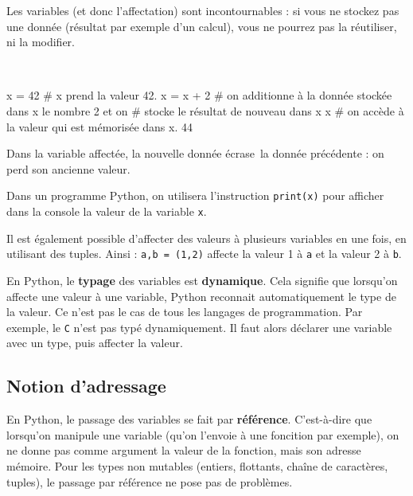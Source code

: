 Les variables (et donc l'affectation) sont incontournables : si vous ne stockez pas une donnée 
(résultat par exemple d'un calcul), vous ne pourrez pas la réutiliser, ni la modifier.



\begin{xxpyconsole}~\\ \vspace{-.5cm}%
\begin{pyconsole}
x = 42       # x prend la valeur 42.
x = x + 2	# on additionne à la donnée stockée dans x le nombre 2 et on 
             # stocke le résultat de nouveau dans x 
x            # on accède à la valeur qui est mémorisée dans x.
44
\end{pyconsole}
\end{xxpyconsole}

Dans la variable affectée, la nouvelle donnée \og écrase\fg\ la donnée précédente : on perd son 
ancienne valeur.

Dans un programme Python, on utilisera l'instruction \texttt{print(x)}
pour afficher dans la console la valeur de la variable \texttt{x}.

Il est également possible d'affecter des valeurs à plusieurs variables en une fois, en utilisant 
des tuples. Ainsi : \texttt{a,b = (1,2)} affecte la valeur 1 à \texttt{a} et la valeur 2 à 
\texttt{b}.


\begin{rem}
En Python, le \textbf{typage} des variables est \textbf{dynamique}. Cela signifie que lorsqu'on affecte une valeur à une variable, Python reconnait automatiquement le type de la valeur. Ce n'est pas le cas de tous les langages de programmation.
Par exemple, le \texttt{C} n'est pas typé dynamiquement. Il faut alors déclarer une variable avec un type, puis affecter la valeur. 

\end{rem}
\subsection{Notion d'adressage}

En Python, le passage des variables se fait par \textbf{référence}. C'est-à-dire que lorsqu'on manipule une variable (qu'on l'envoie à une foncition par exemple), on ne donne pas comme argument la valeur de la fonction, mais son adresse mémoire. Pour les types non mutables (entiers, flottants, chaîne de caractères, tuples), le passage par référence ne pose pas de problèmes. 


